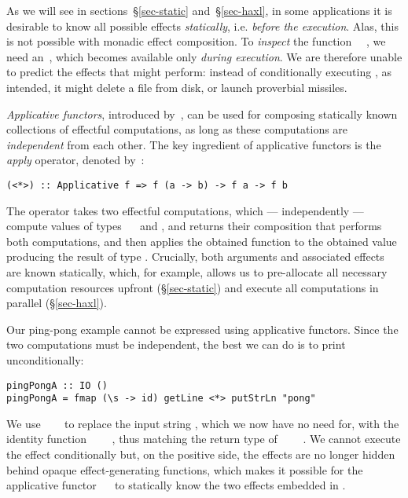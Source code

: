 As we will see in sections~\S\ref{sec-static} and~\S\ref{sec-haxl}, in some
applications it is desirable to know all possible effects \emph{statically},
i.e. \emph{before the execution}. Alas, this is not possible with monadic effect
composition. To \emph{inspect} the function \hs{\s}~\hs{->}~, we need
an~, which becomes available only \emph{during execution}. We are
therefore unable to predict the effects that  might perform:
instead of conditionally executing , as intended, it might delete a
file from disk, or launch proverbial missiles.

\emph{Applicative functors}, introduced by~\citet{mcbride2008applicative}, can
be used for composing statically known collections of effectful computations, as
long as these computations are \emph{independent} from each other. The key
ingredient of applicative functors is the \emph{apply} operator, denoted
by~\hs{<*>}:

\begin{verbatim}
(<*>) :: Applicative f => f (a -> b) -> f a -> f b
\end{verbatim}

\noindent
The operator takes two effectful computations, which --- independently ---
compute values of types ~\hs{->}~ and , and returns their
composition that performs both computations, and then applies the obtained
function to the obtained value producing the result of type . Crucially,
both arguments and associated effects are known statically, which, for example,
allows us to pre-allocate all necessary computation resources upfront
(\S\ref{sec-static}) and execute all computations in parallel
(\S\ref{sec-haxl}).

Our ping-pong example cannot be expressed using applicative functors. Since the
two computations must be independent, the best we can do is to print 
unconditionally:

\vspace{0.5mm}
\begin{verbatim}
pingPongA :: IO ()
pingPongA = fmap (\s -> id) getLine <*> putStrLn "pong"
\end{verbatim}
\vspace{0.5mm}

\noindent
We use ~\hs{(\s}~\hs{->}~ to replace the input string ,
which we now have no need for, with the identity function
~\hs{::}~\hs{()}~\hs{->}~\hs{()}, thus matching the return type of
~~\hs{::}~~\hs{()}. We cannot execute the
 effect conditionally but, on the positive side, the effects are no
longer hidden behind opaque effect-generating functions, which makes it possible
for the applicative functor ~\hs{=}~ to statically know the two
effects embedded in .

